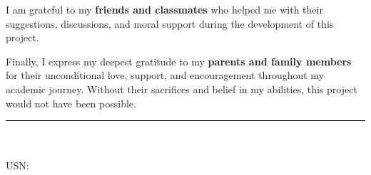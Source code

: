 \begin{center}
\begin{minipage}{0.85\textwidth}
    \vspace{0.5cm}

    \noindent I am grateful to my \textbf{friends and classmates} who helped me with their suggestions, discussions, and moral support during the development of this project.

    \vspace{0.5cm}

    \noindent Finally, I express my deepest gratitude to my \textbf{parents and family members} for their unconditional love, support, and encouragement throughout my academic journey. Without their sacrifices and belief in my abilities, this project would not have been possible.

    \vspace{2cm}

    \noindent\begin{flushright}
      \rule{5cm}{0.5pt}\\
      \studentName\\
      USN: \usnNumber
    \end{flushright}

  \end{minipage}
\end{center}
